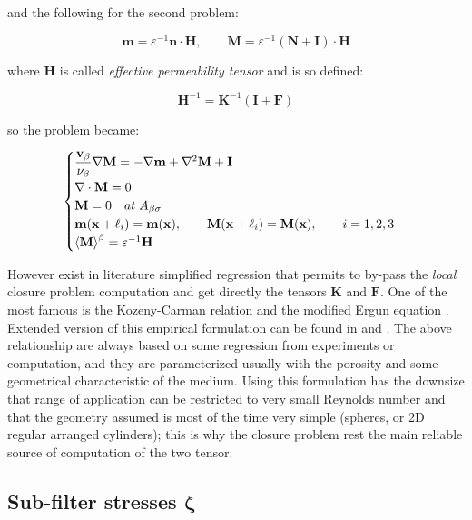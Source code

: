 and the following for the second problem:

$$
\mathbf{m} = \varepsilon^{-1} \mathbf{n} \cdot \mathbf{H}, \qquad \mathbf{M} = \varepsilon^{-1} \left(\mathbf{N} + \mathbf{I} \right)\cdot \mathbf{H}
$$

where $\mathbf{H}$ is called \textit{effective permeability tensor} and is so defined:

$$
\mathbf{H}^{-1} = \mathbf{K}^{-1} \left(\mathbf{I} +\mathbf{F}\right)
$$

so the problem became:

\begin{eqnarray}
	\begin{cases}
		\dfrac{\textbf{v}_{\beta}}{\nu_{\beta}} \nabla \mathbf{M} = -\nabla \mathbf{m} + \nabla^2 \mathbf{M} +\mathbf{I}\\
		\nabla \cdot \mathbf{M} = 0  \\
		\mathbf{M} = 0 \quad at \; A_{\beta \sigma} \\
		\mathbf{m}(\mathbf{x} +\ell_i) = \mathbf{m}(\mathbf{x}), \qquad \mathbf{M}(\mathbf{x} +\ell_i) = \mathbf{M}(\mathbf{x}), \qquad i=1,2,3 \\
		{\left< \mathbf{M} \right>}^{\beta} = \varepsilon^{-1} \mathbf{H}
	\end{cases}
\label{eq:M_problem}
\end{eqnarray}

However exist in literature simplified regression that permits to by-pass the \textit{local} closure problem computation and get directly the tensors $\mathbf{K}$ and $\mathbf{F}$.
One of the most famous is the Kozeny-Carman \citet{kozeny} relation and the modified Ergun equation \cite{transport2002bird}.
Extended version of this empirical formulation can be found in \citet{zampogna2016fluid} and \cite{yazdchi2012towards}.
The above relationship are always based on some regression from experiments or computation, and they are parameterized usually with the porosity and some geometrical characteristic of the medium.
Using this formulation has the downsize that range of application can be restricted to very small Reynolds number and that the geometry assumed is most of the time very simple (spheres, or 2D regular arranged cylinders); this is why the closure problem rest the main reliable source of computation of the two tensor.


\subsection{Sub-filter stresses $\boldsymbol{\zeta}$}

